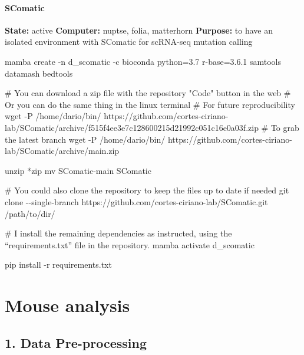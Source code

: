 \documentclass[
  letterpaper,
  DIV=11,
  numbers=noendperiod]{scrreprt}
\newenvironment{Shaded}{\begin{snugshade}}{\end{snugshade}}
\newcommand{\AttributeTok}[1]{\textcolor[rgb]{0.40,0.45,0.13}{#1}}
\newcommand{\CommentTok}[1]{\textcolor[rgb]{0.37,0.37,0.37}{#1}}
\newcommand{\ExtensionTok}[1]{\textcolor[rgb]{0.00,0.23,0.31}{#1}}
\newcommand{\FunctionTok}[1]{\textcolor[rgb]{0.28,0.35,0.67}{#1}}
\newcommand{\NormalTok}[1]{\textcolor[rgb]{0.00,0.23,0.31}{#1}}
\newcommand{\PreprocessorTok}[1]{\textcolor[rgb]{0.68,0.00,0.00}{#1}}
\begin{document}
\subsection{SComatic}\label{scomatic}

\textbf{State:} active \textbf{Computer:} nuptse, folia, matterhorn
\textbf{Purpose:} to have an isolated environment with SComatic for
scRNA-seq mutation calling

\begin{Shaded}
\begin{Highlighting}[]
\ExtensionTok{mamba}\NormalTok{ create }\AttributeTok{{-}n}\NormalTok{ d\_scomatic }\AttributeTok{{-}c}\NormalTok{ bioconda python=3.7 r{-}base=3.6.1 samtools datamash bedtools}

\CommentTok{\# You can download a zip file with the repository "Code" button in the web}
\CommentTok{\# Or you can do the same thing in the linux terminal}
\CommentTok{\# For future reproducibility}
\FunctionTok{wget} \AttributeTok{{-}P}\NormalTok{ /home/dario/bin/ https://github.com/cortes{-}ciriano{-}lab/SComatic/archive/f515f4ee3e7c128600215d21992c051c16e0a03f.zip}
\CommentTok{\# To grab the latest branch}
\FunctionTok{wget} \AttributeTok{{-}P}\NormalTok{ /home/dario/bin/ https://github.com/cortes{-}ciriano{-}lab/SComatic/archive/main.zip}

\FunctionTok{unzip} \PreprocessorTok{*}\NormalTok{zip}
\FunctionTok{mv}\NormalTok{ SComatic{-}main SComatic}

\CommentTok{\# You could also clone the repository to keep the files up to date if needed}
\FunctionTok{git}\NormalTok{ clone }\AttributeTok{{-}{-}single{-}branch}\NormalTok{ https://github.com/cortes{-}ciriano{-}lab/SComatic.git /path/to/dir/}

\CommentTok{\# I install the remaining dependencies as instructed, using the “requirements.txt” file in the repository.}
\ExtensionTok{mamba}\NormalTok{ activate d\_scomatic}

\ExtensionTok{pip}\NormalTok{ install }\AttributeTok{{-}r}\NormalTok{ requirements.txt}
\end{Highlighting}
\end{Shaded}

\part{Mouse analysis}

\chapter{1. Data Pre-processing}\label{data-pre-processing}
\end{document}
